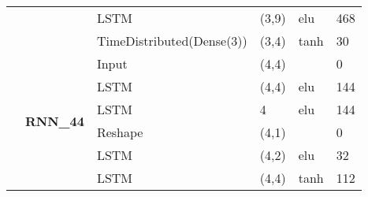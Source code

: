 \begin{table}[H]
\begin{center}
\begin{tabular}{ll|l|l|l|l|}
\multicolumn{1}{|l|}{}                                                                 &                                   & LSTM                               & (3,9)                                & elu                                     & 468                                         \\ \cline{3-6} 
\multicolumn{1}{|l|}{}                                                                 &                                   & TimeDistributed(Dense(3))          & (3,4)                                & tanh                                     & 30                                          \\ \cline{2-6} 
\multicolumn{1}{|l|}{}                                                                 & \multirow{6}{*}{\textbf{RNN\_44}} & Input                              & (4,4)                                &                                          & 0                                           \\ \cline{3-6} 
\multicolumn{1}{|l|}{}                                                                 &                                   & LSTM                               & (4,4)                                & elu                                     & 144                                         \\ \cline{3-6} 
\multicolumn{1}{|l|}{}                                                                 &                                   & LSTM                               & 4                                    & elu                                     & 144                                         \\ \cline{3-6} 
\multicolumn{1}{|l|}{}                                                                 &                                   & Reshape                            & (4,1)                                &                                          & 0                                           \\ \cline{3-6} 
\multicolumn{1}{|l|}{}                                                                 &                                   & LSTM                               & (4,2)                                & elu                                     & 32                                          \\ \cline{3-6} 
\multicolumn{1}{|l|}{}                                                                 &                                   & LSTM                               & (4,4)                                & tanh                                     & 112                                         \\ \cline{2-6} 

\end{tabular}
\end{center}
\end{table}
